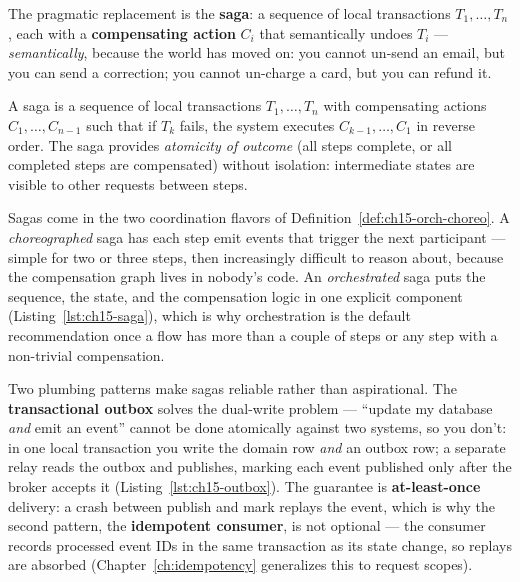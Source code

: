 The pragmatic replacement is the \textbf{saga}: a sequence of local
transactions $T_1, \dots, T_n$, each with a \textbf{compensating action}
$C_i$ that semantically undoes $T_i$ --- \emph{semantically}, because the
world has moved on: you cannot un-send an email, but you can send a
correction; you cannot un-charge a card, but you can refund it.

\begin{definition}[Saga]
\label{def:ch15-saga}
A saga is a sequence of local transactions $T_1, \dots, T_n$ with
compensating actions $C_1, \dots, C_{n-1}$ such that if $T_k$ fails, the
system executes $C_{k-1}, \dots, C_1$ in reverse order. The saga provides
\emph{atomicity of outcome} (all steps complete, or all completed steps are
compensated) without isolation: intermediate states are visible to other
requests between steps.
\end{definition}

Sagas come in the two coordination flavors of
Definition~\ref{def:ch15-orch-choreo}. A \emph{choreographed} saga has each
step emit events that trigger the next participant --- simple for two or
three steps, then increasingly difficult to reason about, because the
compensation graph lives in nobody's code. An \emph{orchestrated} saga puts
the sequence, the state, and the compensation logic in one explicit
component (Listing~\ref{lst:ch15-saga}), which is why orchestration is the
default recommendation once a flow has more than a couple of steps or any
step with a non-trivial compensation.

Two plumbing patterns make sagas reliable rather than aspirational. The
\textbf{transactional outbox} solves the dual-write problem --- ``update my
database \emph{and} emit an event'' cannot be done atomically against two
systems, so you don't: in one local transaction you write the domain row
\emph{and} an outbox row; a separate relay reads the outbox and publishes,
marking each event published only after the broker accepts it
(Listing~\ref{lst:ch15-outbox}). The guarantee is \textbf{at-least-once}
delivery: a crash between publish and mark replays the event, which is why
the second pattern, the \textbf{idempotent consumer}, is not optional ---
the consumer records processed event IDs in the same transaction as its
state change, so replays are absorbed
(Chapter~\ref{ch:idempotency} generalizes this to request scopes).

